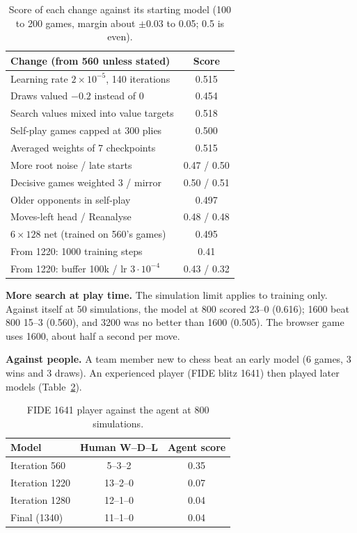 \documentclass[11pt,a4paper,twocolumn]{article}
\begin{document}
\begin{table}[h]
\centering
\small
\begin{tabular}{@{}lc@{}}
\toprule
Change (from 560 unless stated) & Score \\
\midrule
Learning rate $2\times10^{-5}$, 140 iterations & 0.515 \\
Draws valued $-0.2$ instead of 0 & 0.454 \\
Search values mixed into value targets & 0.518 \\
Self-play games capped at 300 plies & 0.500 \\
Averaged weights of 7 checkpoints & 0.515 \\
More root noise / late starts & 0.47 / 0.50 \\
Decisive games weighted 3 / mirror & 0.50 / 0.51 \\
Older opponents in self-play & 0.497 \\
Moves-left head / Reanalyse & 0.48 / 0.48 \\
$6\times128$ net (trained on 560's games) & 0.495 \\
From 1220: 1000 training steps & 0.41 \\
From 1220: buffer 100k / lr $3{\cdot}10^{-4}$ & 0.43 / 0.32 \\
\bottomrule
\end{tabular}
\caption{Score of each change against its starting model (100 to 200 games, margin
about $\pm$0.03 to 0.05; 0.5 is even).}
\label{tab:neg}
\end{table}

\textbf{More search at play time.} The simulation limit applies to training only.
Against itself at 50 simulations, the model at 800 scored 23--0 (0.616); 1600 beat 800
15--3 (0.560), and 3200 was no better than 1600 (0.505). The browser game uses 1600, about
half a second per move.

\textbf{Against people.} A team member new to chess beat an early model (6 games, 3 wins
and 3 draws). An experienced player (FIDE blitz 1641) then played later models
(Table~\ref{tab:human}).

\begin{table}[h]
\centering
\small
\begin{tabular}{@{}lcc@{}}
\toprule
Model & Human W--D--L & Agent score \\
\midrule
Iteration 560 & 5--3--2 & 0.35 \\
Iteration 1220 & 13--2--0 & 0.07 \\
Iteration 1280 & 12--1--0 & 0.04 \\
Final (1340) & 11--1--0 & 0.04 \\
\bottomrule
\end{tabular}
\caption{FIDE 1641 player against the agent at 800 simulations.}
\label{tab:human}
\end{table}
\end{document}
